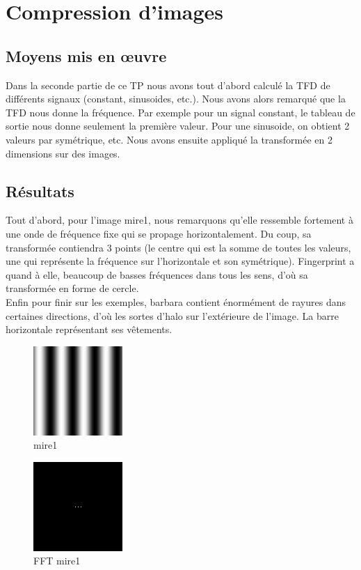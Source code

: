 \documentclass{article}
\begin{document}
\section{Compression d'images}
\subsection{Moyens mis en \oe uvre}
Dans la seconde partie de ce TP nous avons tout d'abord calculé la TFD de différents signaux (constant, sinusoides, etc.). Nous avons alors remarqué que la TFD nous donne la fréquence. Par exemple pour un signal constant, le tableau de sortie nous donne seulement la première valeur. Pour une sinusoide, on obtient 2 valeurs par symétrique, etc. Nous avons ensuite appliqué la transformée en 2 dimensions sur des images.
\subsection{Résultats}
Tout d'abord, pour l'image mire1, nous remarquons qu'elle ressemble fortement à une onde de fréquence fixe qui se propage horizontalement. Du coup, sa transformée contiendra 3 points (le centre qui est la somme de toutes les valeurs, une qui représente la fréquence sur l'horizontale et son symétrique). Fingerprint a quand à elle, beaucoup de basses fréquences dans tous les sens, d'où sa transformée en forme de cercle.\\
Enfin pour finir sur les exemples, barbara contient énormément de rayures dans certaines directions, d'où les sortes d'halo sur l'extérieure de l'image. La barre horizontale représentant ses vêtements.\\
\begin{figure}
	\begin{center}
		\includegraphics[scale=0.7]{mire1}\\
		mire1
	\end{center}
\end{figure}
\begin{figure}
	\begin{center}
		\includegraphics[scale=0.7]{mire1_FFT}\\
		FFT mire1
	\end{center}
\end{figure}
\end{document}
